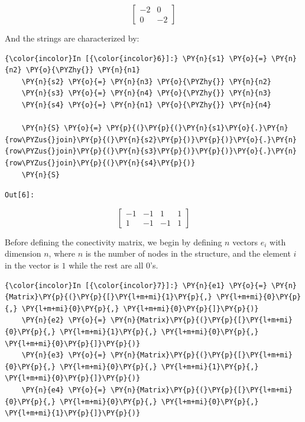 \begin{equation*}
    \left[\begin{matrix}-2 & 0\\0 & -2\end{matrix}\right]
\end{equation*}



And the strings are characterized by:

\begin{Verbatim}[commandchars=\\\{\}]
    {\color{incolor}In [{\color{incolor}6}]:} \PY{n}{s1} \PY{o}{=} \PY{n}{n2} \PY{o}{\PYZhy{}} \PY{n}{n1}
    \PY{n}{s2} \PY{o}{=} \PY{n}{n3} \PY{o}{\PYZhy{}} \PY{n}{n2}
    \PY{n}{s3} \PY{o}{=} \PY{n}{n4} \PY{o}{\PYZhy{}} \PY{n}{n3}
    \PY{n}{s4} \PY{o}{=} \PY{n}{n1} \PY{o}{\PYZhy{}} \PY{n}{n4}

    \PY{n}{S} \PY{o}{=} \PY{p}{(}\PY{p}{(}\PY{n}{s1}\PY{o}{.}\PY{n}{row\PYZus{}join}\PY{p}{(}\PY{n}{s2}\PY{p}{)}\PY{p}{)}\PY{o}{.}\PY{n}{row\PYZus{}join}\PY{p}{(}\PY{n}{s3}\PY{p}{)}\PY{p}{)}\PY{o}{.}\PY{n}{row\PYZus{}join}\PY{p}{(}\PY{n}{s4}\PY{p}{)}
    \PY{n}{S}
\end{Verbatim}
\texttt{\color{outcolor}Out[{\color{outcolor}6}]:}


\begin{equation*}
    \left[\begin{matrix}-1 & -1 & 1 & 1\\1 & -1 & -1 & 1\end{matrix}\right]
\end{equation*}



Before defining the conectivity matrix, we begin by defining \(n\)
vectors \(e_i\) with dimension \(n\), where \(n\) is the number of nodes
in the structure, and the element \(i\) in the vector is \(1\) while the
rest are all \(0\)'s.

\begin{Verbatim}[commandchars=\\\{\}]
    {\color{incolor}In [{\color{incolor}7}]:} \PY{n}{e1} \PY{o}{=} \PY{n}{Matrix}\PY{p}{(}\PY{p}{[}\PY{l+m+mi}{1}\PY{p}{,} \PY{l+m+mi}{0}\PY{p}{,} \PY{l+m+mi}{0}\PY{p}{,} \PY{l+m+mi}{0}\PY{p}{]}\PY{p}{)}
    \PY{n}{e2} \PY{o}{=} \PY{n}{Matrix}\PY{p}{(}\PY{p}{[}\PY{l+m+mi}{0}\PY{p}{,} \PY{l+m+mi}{1}\PY{p}{,} \PY{l+m+mi}{0}\PY{p}{,} \PY{l+m+mi}{0}\PY{p}{]}\PY{p}{)}
    \PY{n}{e3} \PY{o}{=} \PY{n}{Matrix}\PY{p}{(}\PY{p}{[}\PY{l+m+mi}{0}\PY{p}{,} \PY{l+m+mi}{0}\PY{p}{,} \PY{l+m+mi}{1}\PY{p}{,} \PY{l+m+mi}{0}\PY{p}{]}\PY{p}{)}
    \PY{n}{e4} \PY{o}{=} \PY{n}{Matrix}\PY{p}{(}\PY{p}{[}\PY{l+m+mi}{0}\PY{p}{,} \PY{l+m+mi}{0}\PY{p}{,} \PY{l+m+mi}{0}\PY{p}{,} \PY{l+m+mi}{1}\PY{p}{]}\PY{p}{)}
\end{Verbatim}

